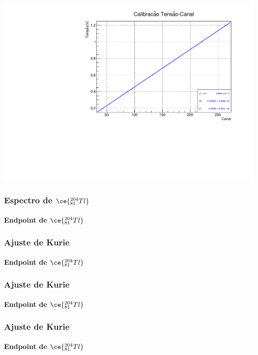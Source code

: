 \documentclass[10pt]{beamer}
\begin{document}
\begin{frame}
     \includegraphics[scale=0.25]{calib2.pdf}

\end{frame}

\begin{frame}
\frametitle{Espectro de $\ce{^{204}_{81}Tl}$}
\framesubtitle{Endpoint de $\ce{^{204}_{81}Tl}$}

  

\end{frame}

\begin{frame}\frametitle{Ajuste de Kurie}\framesubtitle{Endpoint de $\ce{^{204}_{81}Tl}$}

  

\end{frame}

\begin{frame}\frametitle{Ajuste de Kurie}\framesubtitle{Endpoint de $\ce{^{204}_{81}Tl}$}

 

\end{frame}


\begin{frame}\frametitle{Ajuste de Kurie}\framesubtitle{Endpoint de $\ce{^{204}_{81}Tl}$}


\end{frame}
\end{document}
